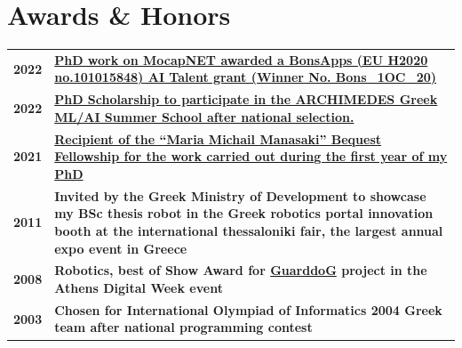 \documentclass[a4,8pt]{article}
\newcommand{\hskills}[1]{
\textbf{\bfseries #1} }
\begin{document}
\section{Awards \& Honors}
\linespread{0.6} 
\vspace{-0.2cm}
\begin{tabular}[t]{ p{4em} p{50em}}

\hskills{2022} & \hskills{\href{https://bonsapps-1oc-ai-talents.fundingbox.com/}{PhD work on MocapNET awarded a BonsApps (EU H2020 no.101015848) AI Talent grant (Winner No. Bons\_1OC\_20)}} \\
\hskills{2022} & \hskills{\href{https://www.athenarc.gr/en/news/archimedes-summer-program-2022}{ PhD Scholarship to participate in the ARCHIMEDES Greek ML/AI Summer School after national selection. }} \\
\hskills{2021} & \hskills{\href{https://www.csd.uoc.gr/CSD/index.jsp?custom=manasakis\&lang=en}{Recipient of the “Maria Michail Manasaki” Bequest Fellowship for the work carried out during the first year of my PhD }} \\

\hskills{2011} & \hskills{Invited by the Greek Ministry of Development to showcase my BSc thesis robot in the Greek robotics portal innovation booth at the international thessaloniki fair, the largest annual expo event in Greece} \\

\hskills{2008} & \hskills{Robotics, best of Show Award for \href{https://github.com/AmmarkoV/RoboVision/blob/master/Documentation/GuarDDoG_RoboVision.pdf}{GuarddoG} project in the Athens Digital Week event} \\

\hskills{2003} & \hskills{Chosen for International Olympiad of Informatics 2004 Greek team after national programming contest}  \\ %

\end{tabular}
\linespread{0.82} 
\end{document}
